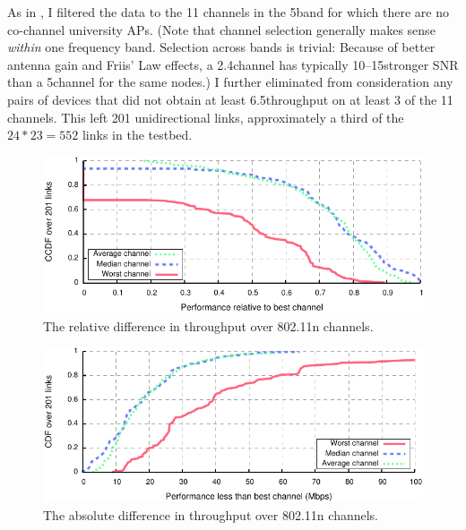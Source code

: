 As in , I filtered the data to the 11 channels in the 5\GHz band for which there are no co-channel university APs. (Note that channel selection generally makes sense \emph{within} one frequency band. Selection across bands is trivial: Because of better antenna gain and Friis' Law effects, a 2.4\GHz channel has typically 10\dB--15\dB stronger SNR than a 5\GHz channel for the same nodes.) I further eliminated from consideration any pairs of devices that did not obtain at least 6.5\Mbps throughput on at least 3 of the 11 channels. This left 201 unidirectional links, approximately a third of the $24*23=552$ links in the testbed.

\begin{figure}[t]
	\centering
	\includegraphics[width=\textwidth]{figures/applications/chan_sel_rel_diff.pdf}
	\caption[The relative difference in throughput over 802.11n channels]{\label{fig:chan_sel_rel_diff}The relative difference in throughput over 802.11n channels.}
\end{figure}

\begin{figure}[t]
	\centering
	\includegraphics[width=\textwidth]{figures/applications/chan_sel_tpt_diff.pdf}
	\caption[The absolute difference in throughput over 802.11n channels]{\label{fig:chan_sel_tpt_diff}The absolute difference in throughput over 802.11n channels.}
\end{figure}


